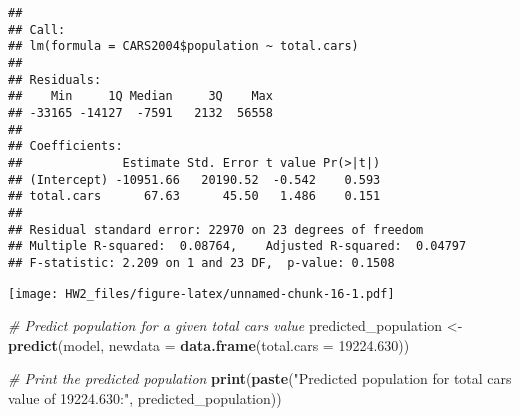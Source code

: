 \documentclass[
]{article}
\newenvironment{Shaded}{\begin{snugshade}}{\end{snugshade}}
\newcommand{\AttributeTok}[1]{\textcolor[rgb]{0.13,0.29,0.53}{#1}}
\newcommand{\CommentTok}[1]{\textcolor[rgb]{0.56,0.35,0.01}{\textit{#1}}}
\newcommand{\DecValTok}[1]{\textcolor[rgb]{0.00,0.00,0.81}{#1}}
\newcommand{\FloatTok}[1]{\textcolor[rgb]{0.00,0.00,0.81}{#1}}
\newcommand{\FunctionTok}[1]{\textcolor[rgb]{0.13,0.29,0.53}{\textbf{#1}}}
\newcommand{\NormalTok}[1]{#1}
\newcommand{\OtherTok}[1]{\textcolor[rgb]{0.56,0.35,0.01}{#1}}
\newcommand{\SpecialCharTok}[1]{\textcolor[rgb]{0.81,0.36,0.00}{\textbf{#1}}}
\newcommand{\StringTok}[1]{\textcolor[rgb]{0.31,0.60,0.02}{#1}}
\begin{document}
\begin{verbatim}
## 
## Call:
## lm(formula = CARS2004$population ~ total.cars)
## 
## Residuals:
##    Min     1Q Median     3Q    Max 
## -33165 -14127  -7591   2132  56558 
## 
## Coefficients:
##              Estimate Std. Error t value Pr(>|t|)
## (Intercept) -10951.66   20190.52  -0.542    0.593
## total.cars      67.63      45.50   1.486    0.151
## 
## Residual standard error: 22970 on 23 degrees of freedom
## Multiple R-squared:  0.08764,    Adjusted R-squared:  0.04797 
## F-statistic: 2.209 on 1 and 23 DF,  p-value: 0.1508
\end{verbatim}

\begin{Shaded}
\end{Shaded}

\texttt{[image: HW2\_files/figure-latex/unnamed-chunk-16-1.pdf]}

\begin{Shaded}
\begin{Highlighting}[]
\CommentTok{\# Predict population for a given total cars value}
\NormalTok{predicted\_population }\OtherTok{\textless{}{-}} \FunctionTok{predict}\NormalTok{(model, }\AttributeTok{newdata =} \FunctionTok{data.frame}\NormalTok{(}\AttributeTok{total.cars =} \FloatTok{19224.630}\NormalTok{))}

\CommentTok{\# Print the predicted population}
\FunctionTok{print}\NormalTok{(}\FunctionTok{paste}\NormalTok{(}\StringTok{"Predicted population for total cars value of 19224.630:"}\NormalTok{, predicted\_population))}
\end{Highlighting}
\end{Shaded}
\end{document}

